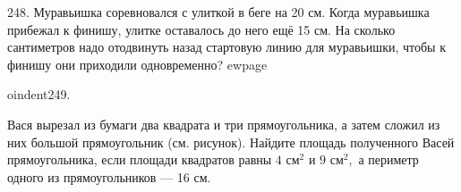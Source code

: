 248. Муравьишка соревновался с улиткой в беге на 20 см. Когда муравьишка прибежал к финишу, улитке оставалось до него ещё 15 см. На сколько сантиметров надо отодвинуть назад стартовую линию для муравьишки, чтобы к финишу они приходили одновременно?
ewpage

oindent249. \begin{center}
\begin{figure}[ht!]
\end{figure}
\end{center}
Вася вырезал из бумаги два квадрата и три прямоугольника, а затем сложил из них большой прямоугольник (см. рисунок). Найдите площадь  полученного Васей прямоугольника, если площади квадратов равны $4\text{ см}^2$ и $9\text{ см}^2,$ а периметр одного из прямоугольников --- 16 см.\\
